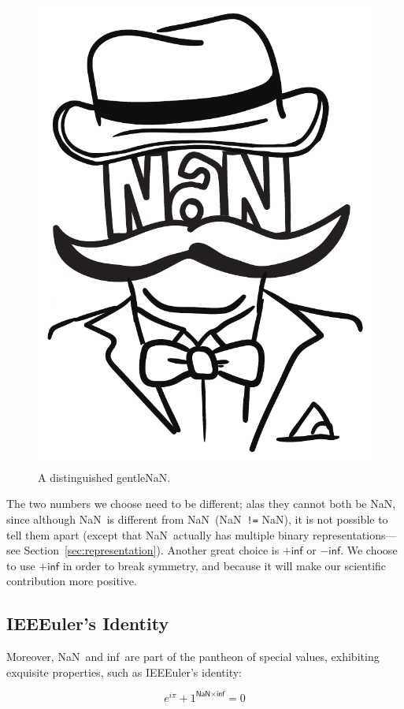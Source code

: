 \documentclass[twocolumn,cm]{article}
\newcommand\nan{\textsf{NaN}}
\renewcommand\inf{\textsf{inf}}
\begin{document}
\begin{figure}[ht]
  \begin{center}
  \includegraphics[width=0.55 \linewidth]{gentlenan}
  \caption{A distinguished gentleNaN.} \label{fig:gentlenan}
  \end{center}
\end{figure}

The two numbers we choose need to be different; alas they cannot both
be \nan, since although \nan\ is different from \nan\ (\nan\ {\tt !=}
\nan), it is not possible to tell them apart (except that
\nan\ actually has multiple binary
representations---see Section~\ref{sec:representation}). Another great choice is
$+\inf$ or $-\inf$. We choose to use $+\inf$ in order to break
symmetry, and because it will make our scientific contribution more
positive.


\subsection{IEEEuler's Identity}

Moreover, \nan\ and \inf\ are part of the pantheon of special values, exhibiting
exquisite properties, such as IEEEuler's identity:

\begin{huge}
  \[
  e^{i \pi} + 1^{\nan \times \inf} = 0
  \]
\end{huge}
\end{document}
